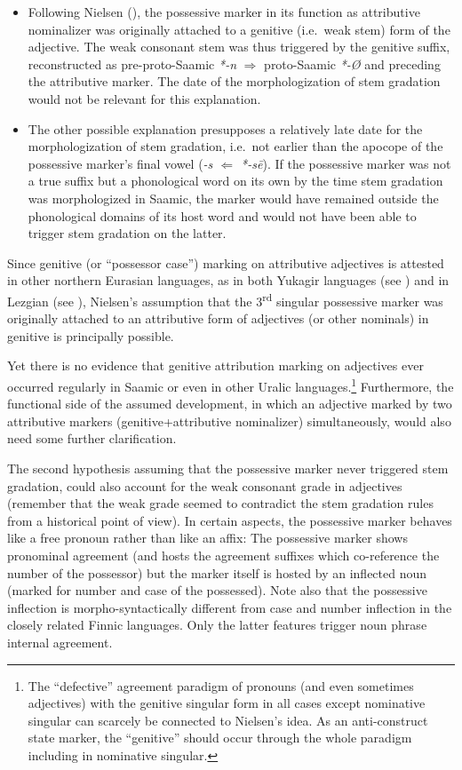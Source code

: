 {\begin{itemize}
\item Following Nielsen (\citeyear{nielsen1945b}), the possessive marker in its function as attributive nominalizer was originally attached to a genitive (i.e.~weak stem) form of the adjective. The weak consonant stem was thus triggered by the genitive suffix, reconstructed as pre-proto-Saamic \textit{*-n} $\Rightarrow$ proto-Saamic \mbox{\textit{*-Ø}} \cite[65]{sammallahti1998b} and preceding the attributive marker. The date of the morphologization of stem gradation would not be relevant for this explanation.
\item The other possible explanation presupposes a relatively late date for the morphologization of stem gradation, i.e.~not earlier than the apocope of the possessive marker's final vowel (\textit{-s $\Leftarrow$ *-sē}). If the possessive marker was not a true suffix but a phonological word on its own by the time stem gradation was morphologized in Saamic, the marker would have remained outside the phonological domains of its host word and would not have been able to trigger stem gradation on the latter. 
\end{itemize}

\noindent Since genitive (or “possessor case”) marking on attributive adjectives is attested in other northern Eurasian languages, as in both Yukagir languages (see ) and in Lezgian (see ), Nielsen's assumption that the 3\textsuperscript{rd} singular possessive marker was originally attached to an attributive form of adjectives (or other nominals) in genitive is principally possible. 

Yet there is no evidence that genitive attribution marking on adjectives ever occurred regularly in Saamic or even in other Uralic languages.\footnote{The “defective” agreement paradigm of pronouns (and even sometimes adjectives) with the genitive singular form in all cases except nominative singular can scarcely be connected to Nielsen's idea. As an anti-construct state marker, the “genitive” should occur through the whole paradigm including in nominative singular.} Furthermore, the functional side of the assumed development, in which an adjective marked by two attributive markers (genitive+attributive nominalizer) simultaneously, would also need some further clarification.

The second hypothesis assuming that the possessive marker never triggered stem gradation, could also account for the weak consonant grade in adjectives (remember that the weak grade seemed to contradict the stem gradation rules from a historical point of view). In certain aspects, the possessive marker behaves like a free pronoun rather than like an affix: The possessive marker shows pronominal agreement (and hosts the agreement suffixes which co-reference the number of the possessor) but the marker itself is hosted by an inflected noun (marked for number and case of the possessed). Note also that the possessive inflection is morpho-syntactically different from case and number inflection in the closely related Finnic languages. Only the latter features trigger noun phrase internal agreement.

}
